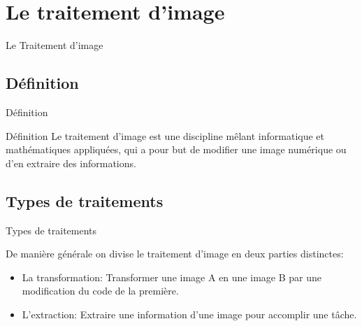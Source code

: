 \documentclass[french]{beamer}
\begin{document}
            
    \section{Le traitement d'image}
        \begin{frame}{Le Traitement d'image}
        \end{frame}
        
        \subsection{Définition}
            \begin{frame}{Définition}
                \tableofcontents[sectionstyle=show/hide,subsectionstyle=show/shaded/hide]
            \end{frame}
            \begin{frame}
                \begin{center}
                    \begin{block}{Définition}
                        Le traitement d'image est une discipline mêlant informatique et mathématiques appliquées, qui a pour but de modifier une image numérique ou d'en extraire des informations.
                    \end{block}
                \end{center}
            \end{frame}
        \subsection{Types de traitements}
            \begin{frame}{Types de traitements}
                \tableofcontents[sectionstyle=show/hide,subsectionstyle=show/shaded/hide]
            \end{frame}
            \begin{frame}
                De manière générale on divise le traitement d'image en deux parties distinctes:
                \begin{itemize}
                    \item La transformation: Transformer une image A en une image B par une modification du code de la première.
                    \item L'extraction: Extraire une information d'une image pour accomplir une tâche.
                \end{itemize}
            \end{frame}
            
\end{document}
